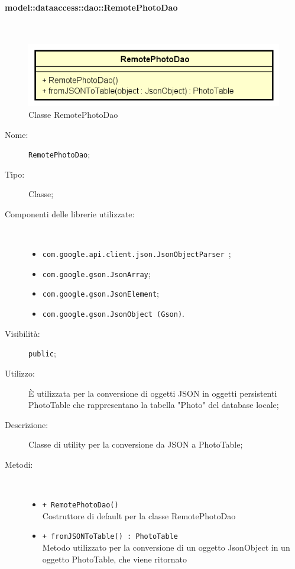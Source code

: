 \documentclass[../DefinizioneDiProdotto.tex]{subfiles}
\begin{document}
\paragraph{model::dataaccess::dao::RemotePhotoDao}
\
\begin{figure}[H]
	\centering
	\includegraphics[width=\maxwidth]{img/RemotePhotoDao.png}
	\caption{Classe RemotePhotoDao}\label{fig:model::dataaccess::dao::RemotePhotoDao} 
\end{figure}
\begin{description}
	\item[Nome:] \texttt{RemotePhotoDao};
	\item[Tipo:] Classe;
	\item[Componenti delle librerie utilizzate:] \
	\begin{itemize}
		\item \texttt{com.google.api.client.json.JsonObjectParser
		};
		
		\item \texttt{com.google.gson.JsonArray};
		
		\item \texttt{com.google.gson.JsonElement};
		
		\item \texttt{com.google.gson.JsonObject (Gson)}.
		
	\end{itemize}
	\item[Visibilità:] \texttt{public};
	\item[Utilizzo:] È utilizzata per la conversione di oggetti JSON in oggetti persistenti PhotoTable che rappresentano la tabella "Photo" del database locale;
	\item[Descrizione:] Classe di utility per la conversione da JSON a PhotoTable;
	\item[Metodi:] \
	\begin{itemize}
		\item \texttt{+ RemotePhotoDao()}\\
		Costruttore di default per la classe RemotePhotoDao
		\item \texttt{+ fromJSONToTable() : PhotoTable}\\
		Metodo utilizzato per la conversione di un oggetto JsonObject in un oggetto PhotoTable, che viene ritornato
	\end{itemize}
\end{description}
\end{document}
